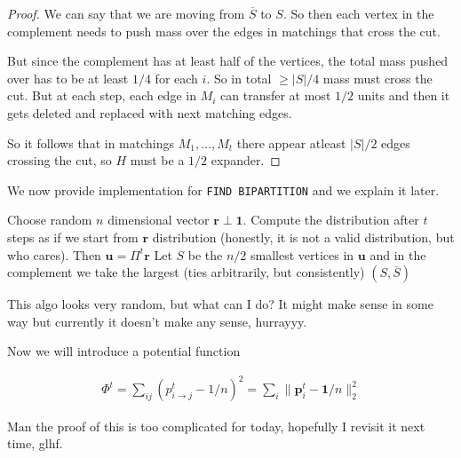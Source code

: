 \begin{definicija}
\begin{proof}
        We can say that we are moving from $\overline{S}$ to $S$. So then each vertex in the complement needs to push mass over the edges in matchings that cross the cut. 

        But since the complement has at least half of the vertices, the total mass pushed over has to be at least $1/4$ for each $i$. So in total $\geq |S|/4$ mass must cross the cut. But at each step, each edge in $M_i$ can transfer at most $1/2$ units and then it gets deleted and replaced with next matching edges.

        So it follows that in matchings $M_1, \ldots, M_t$ there appear atleast $|S|/2$ edges crossing the cut, so $H$ must be a $1/2$ expander.
    \end{proof}


    We now provide implementation for \texttt{FIND BIPARTITION} and we explain it later.

    \begin{algorithm}
    \caption{FIND BIPARTITION($G, M_1, \ldots, M_t$)}\label{alg:findbiparition}
    \begin{algorithmic}

    \State Choose random $n$ dimensional vector $\mathbf{r} \perp \mathbf{1}$.
    \State Compute the distribution after $t$ steps as if we start from $\mathbf{r}$ distribution (honestly, it is not a valid distribution, but who cares). Then $\mathbf{u} = \Pi ^t \mathbf{r}$
    \State Let $S$ be the $n/2$ smallest vertices in $\mathbf{u}$ and in the complement we take the largest (ties arbitrarily, but consistently)
    \State \Return $(S, \overline{S})$
    \end{algorithmic}
    \end{algorithm}

    This algo looks very random, but what can I do? It might make sense in some way but currently it doesn't make any sense, hurrayyy.


    Now we will introduce a potential function

    \begin{align*}
        \Phi ^t = \sum_{ij} (p_{i \rightarrow j}^t - 1/n )^2 = \sum_i \| \mathbf{p}_i ^t - \mathbf{1}/n \|_2 ^2
    \end{align*}

    Man the proof of this is too complicated for today, hopefully I revisit it next time, glhf.

    
    

    
    
\end{definicija}